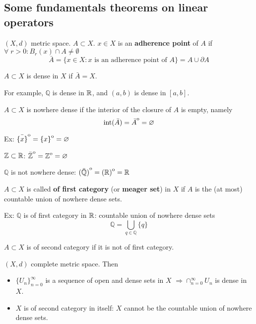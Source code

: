 \subsection*{Some fundamentals theorems on linear operators}
\begin{definition}
    \((X, d)\) metric space. \(A \subset X\). \(x \in X \) is an \textbf{adherence point} of \(A\) if \(\forall \; r>0: B_r(x) \cap A \neq \emptyset\)
    \[
        \bar{A} = \{ x \in X: x \text{ is an adherence point of } A \} = A \cup \partial A
    \]
\end{definition}
\begin{definition}
    \(A \subset X\) is dense in \(X\) if \(\bar{A} = X\).
\end{definition}
For example, \(\mathbb{Q}\) is dense in \(\mathbb{R}\), and \((a, b)\) is dense in \([a, b]\).
\begin{definition}
    \(A \subset X\) is nowhere dense if the interior of the closure of \(A\) is empty, namely
    \[
       \text{int} (\bar{A}) = {\kern0pt\bar{A}}^{\mathrm{o}} = \varnothing  
    \]
\end{definition}

Ex: \({\kern0pt\bar{\{x\}}}^{\mathrm{o}} = {\kern0pt\{x\}}^{\mathrm{o}} = \varnothing\)

\(\mathbb{Z} \subset \mathbb{R}\): \({\kern0pt\bar{\mathbb{Z}}}^{\mathrm{o}}={\kern0pt\mathbb{Z}}^{\mathrm{o}} = \varnothing\)

\(\mathbb{Q} \) is not nowhere dense: \({\kern0pt(\bar{\mathbb{Q}})}^{\mathrm{o}} = {\kern0pt(\mathbb{R})}^{\mathrm{o}} = \mathbb{R} \)
\begin{definition}
    \(A \subset X\) is called \textbf{of first category} (or \textbf{meager set}) in \(X\) if \(A\) is the (at most) countable union of nowhere dense sets. 
\end{definition}

Ex: \(\mathbb{Q}\) is of first category in \(\mathbb{R}\): countable union of nowhere dense sets
\[
    \mathbb{Q} = \bigcup_{q \in \mathbb{Q}} \{q\}
\]
\begin{definition}
    \(A \subset X\) is of second category if it is not of first category.
\end{definition}
\begin{theorem}
    \((X, d)\) complete metric space. Then 
    \begin{itemize}
        \item \(\{U_n\}_{n=0}^\infty\) is a sequence of open and dense sets in \(X\) \(\Rightarrow \cap_{n=0}^\infty U_n\) is dense in \(X\).
        \item \(X\) is of second category in itself: \(X\) cannot be the countable union of nowhere dense sets. 
    \end{itemize}
\end{theorem}


